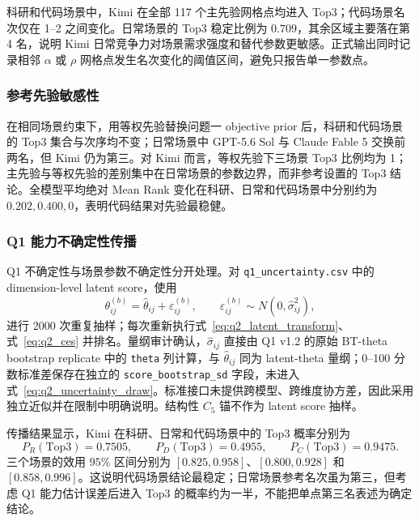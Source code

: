 科研和代码场景中，Kimi 在全部 117 个主先验网格点均进入 Top3；代码场景名次仅在 1--2 之间变化。日常场景的 Top3 稳定比例为 $0.709$，其余区域主要落在第 4 名，说明 Kimi 日常竞争力对场景需求强度和替代参数更敏感。正式输出同时记录相邻 $\alpha$ 或 $\rho$ 网格点发生名次变化的阈值区间，避免只报告单一参数点。

\subsubsection{参考先验敏感性}

在相同场景约束下，用等权先验替换问题一 objective prior 后，科研和代码场景的 Top3 集合与次序均不变；日常场景中 GPT-5.6 Sol 与 Claude Fable 5 交换前两名，但 Kimi 仍为第三。对 Kimi 而言，等权先验下三场景 Top3 比例均为 1；主先验与等权先验的差别集中在日常场景的参数边界，而非参考设置的 Top3 结论。全模型平均绝对 Mean Rank 变化在科研、日常和代码场景中分别约为 $0.202,0.400,0$，表明代码结果对先验最稳健。

\subsubsection{Q1 能力不确定性传播}

Q1 不确定性与场景参数不确定性分开处理。对 \texttt{q1\_uncertainty.csv} 中的 dimension-level latent score，使用
\begin{equation}
\theta_{ij}^{(b)}
=\widehat\theta_{ij}
+\varepsilon_{ij}^{(b)},
\qquad
\varepsilon_{ij}^{(b)}\sim N(0,\widehat\sigma_{ij}^{2}),
\label{eq:q2_uncertainty_draw}
\end{equation}
进行 2000 次重复抽样；每次重新执行式~\eqref{eq:q2_latent_transform}、式~\eqref{eq:q2_ces} 并排名。量纲审计确认，$\widehat\sigma_{ij}$ 直接由 Q1 v1.2 的原始 BT-theta bootstrap replicate 中的 \texttt{theta} 列计算，与 $\widehat\theta_{ij}$ 同为 latent-theta 量纲；0--100 分数标准差保存在独立的 \texttt{score\_bootstrap\_sd} 字段，未进入式~\eqref{eq:q2_uncertainty_draw}。标准接口未提供跨模型、跨维度协方差，因此采用独立近似并在限制中明确说明。结构性 $C_5$ 锚不作为 latent score 抽样。

传播结果显示，Kimi 在科研、日常和代码场景中的 Top3 概率分别为
\begin{equation}
P_R(\mathrm{Top3})=0.7505,\qquad
P_D(\mathrm{Top3})=0.4955,\qquad
P_C(\mathrm{Top3})=0.9475.
\label{eq:q2_kimi_uncertainty_top3}
\end{equation}
三个场景的效用 $95\%$ 区间分别为 $[0.825,0.958]$、$[0.800,0.928]$ 和 $[0.858,0.996]$。这说明代码场景结论最稳定；日常场景参考名次虽为第三，但考虑 Q1 能力估计误差后进入 Top3 的概率约为一半，不能把单点第三名表述为确定结论。

